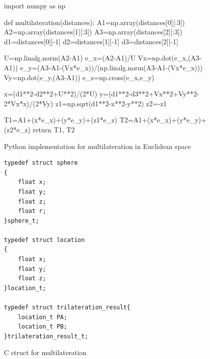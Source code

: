 \documentclass[\main/main.tex]{subfiles}
\begin{document}
\begin{figure}[H]
    \begin{python}
import numpy as np

def multilateration(distances):
    A1=np.array(distances[0][:3])
    A2=np.array(distances[1][:3])
    A3=np.array(distances[2][:3])
    d1=distances[0][-1]
    d2=distances[1][-1]
    d3=distances[2][-1]

    U=np.linalg.norm(A2-A1)
    e_x=(A2-A1)/U
    Vx=np.dot(e_x,(A3-A1))
    e_y=(A3-A1-(Vx*e_x))/(np.linalg.norm(A3-A1-(Vx*e_x)))
    Vy=np.dot(e_y,(A3-A1))
    e_z=np.cross(e_x,e_y)

    x=(d1**2-d2**2+U**2)/(2*U)
    y=(d1**2-d3**2+Vx**2+Vy**2-2*Vx*x)/(2*Vy)
    z1=np.sqrt(d1**2-x**2-y**2)
    z2=-z1

    T1=A1+(x*e_x)+(y*e_y)+(z1*e_z)
    T2=A1+(x*e_x)+(y*e_y)+(z2*e_z)
    return T1, T2
    \end{python}
    \caption{Python implementation for multilateration in Euclidean space}
    \label{fig:multilateration_python_implementation}
\end{figure}

\begin{figure}[H]
    \begin{lstlisting}[style=CStyle]
typedef struct sphere
{
    float x;
    float y;
    float z;
    float r;
}sphere_t;

typedef struct location
{
    float x;
    float y;
    float z;
}location_t;

typedef struct trilateration_result{
    location_t PA;
    location_t PB;
}trilateration_result_t;
\end{lstlisting}
\caption{C struct for multilateration}
\label{fig:c_struct_for_multilateration}
\end{figure}
\end{document}

